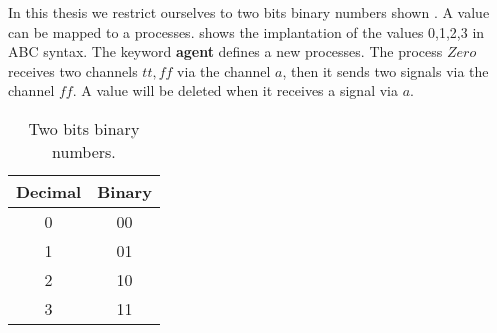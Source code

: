 In this thesis we restrict ourselves to two bits binary numbers shown . A value can be mapped to a \picalc{} processes.  shows the \picalc{} implantation of the values 0,1,2,3 in ABC syntax. The keyword \textbf{agent} defines a new processes. The process $Zero$ receives two channels $tt,ff$ via the channel $a$, then it sends two signals via the channel $ff$. A value will be deleted when it receives a signal via $a$.
\begin{table}[H]
\centering
\begin{tabular}{|c|c|}
\hline
Decimal & Binary \\ \hline
0       & 00     \\ \hline
1       & 01     \\ \hline
2       & 10     \\ \hline
3       & 11     \\ \hline
\end{tabular}%
\caption{Two bits binary numbers.}
\label{two_bit_binary_numbers}
\end{table}

